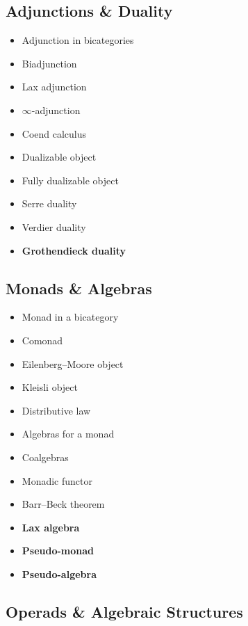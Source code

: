 \subsection{Adjunctions \& Duality}

\begin{itemize}
\item Adjunction in bicategories
\item Biadjunction
\item Lax adjunction
\item $\infty$-adjunction
\item Coend calculus
\item Dualizable object
\item Fully dualizable object
\item Serre duality
\item Verdier duality
\item \textbf{Grothendieck duality}
\end{itemize}

\subsection{Monads \& Algebras}

\begin{itemize}
\item Monad in a bicategory
\item Comonad
\item Eilenberg--Moore object
\item Kleisli object
\item Distributive law
\item Algebras for a monad
\item Coalgebras
\item Monadic functor
\item Barr--Beck theorem
\item \textbf{Lax algebra}
\item \textbf{Pseudo-monad}
\item \textbf{Pseudo-algebra}
\end{itemize}

\subsection{Operads \& Algebraic Structures}


